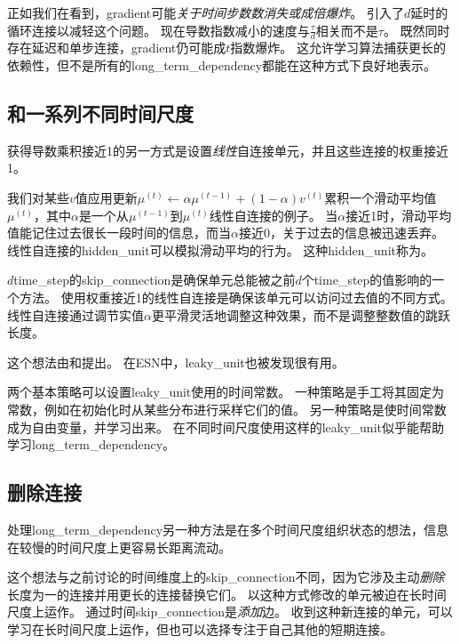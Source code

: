 正如我们在看到，\gls{gradient}可能\emph{关于时间步数数消失或成倍爆炸}。
\citep{Lin-ieeetnn96}引入了$d$延时的循环连接以减轻这个问题。
现在导数指数减小的速度与$\frac{\tau}{d}$相关而不是$\tau$。
既然同时存在延迟和单步连接，\gls{gradient}仍可能成$t$指数爆炸。
这允许学习算法捕获更长的依赖性，但不是所有的\gls{long_term_dependency}都能在这种方式下良好地表示。


\subsection{和一系列不同时间尺度}
\label{sec:leaky_units_and_a_spectrum_of_different_time_scales}
获得导数乘积接近1的另一方式是设置\emph{线性}自连接单元，并且这些连接的权重接近1。

我们对某些$v$值应用更新$\mu^{(t)} \gets \alpha \mu^{(t-1)} + (1-\alpha) v^{(t)}$累积一个滑动平均值$\mu^{(t)}$，其中$\alpha$是一个从$ \mu^{(t-1)}$到$ \mu^{(t)}$线性自连接的例子。
当$\alpha$接近1时，滑动平均值能记住过去很长一段时间的信息，而当$\alpha$接近0，关于过去的信息被迅速丢弃。
线性自连接的\gls{hidden_unit}可以模拟滑动平均的行为。
这种\gls{hidden_unit}称为。

$d$\gls{time_step}的\gls{skip_connection}是确保单元总能被之前$d$个\gls{time_step}的值影响的一个方法。
使用权重接近1的线性自连接是确保该单元可以访问过去值的不同方式。
线性自连接通过调节实值$\alpha$更平滑灵活地调整这种效果，而不是调整整数值的跳跃长度。

这个想法由\cite{Mozer-nips92}和\cite{ElHihi+Bengio-nips8}提出。
在\gls{ESN}中，\gls{leaky_unit}也被发现很有用\citep{JaegerLPS07}。

两个基本策略可以设置\gls{leaky_unit}使用的时间常数。
一种策略是手工将其固定为常数，例如在初始化时从某些分布进行采样它们的值。
另一种策略是使时间常数成为自由变量，并学习出来。
在不同时间尺度使用这样的\gls{leaky_unit}似乎能帮助学习\gls{long_term_dependency}\citep{Mozer-nips92,Pascanu+al-ICML2013-small}。

\subsection{删除连接}
\label{sec:removing_connections}
处理\gls{long_term_dependency}另一种方法是在多个时间尺度组织状态的想法\citep{ElHihi+Bengio-nips8}，信息在较慢的时间尺度上更容易长距离流动。

这个想法与之前讨论的时间维度上的\gls{skip_connection}不同，因为它涉及主动\emph{删除}长度为一的连接并用更长的连接替换它们。
以这种方式修改的单元被迫在长时间尺度上运作。
通过时间\gls{skip_connection}是\emph{添加}边。
收到这种新连接的单元，可以学习在长时间尺度上运作，但也可以选择专注于自己其他的短期连接。

